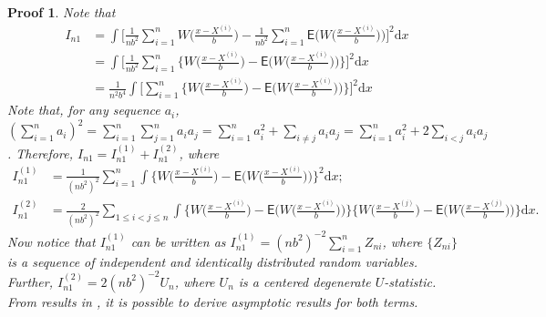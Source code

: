 \documentclass{article}
\newtheorem{Proof}{Proof}[section]
\begin{document}
\begin{Proof}
    Note that
    \begin{align}
        I_{n1} &= \int \Bigg[ \frac{1}{nb^2} \sum_{i=1}^{n} W \Bigg( \frac{x - X^{(i)}}{b} \Bigg) - \frac{1}{nb^2} \sum_{i=1}^{n} \mathsf{E} \Bigg( W \Bigg( \frac{x - X^{(i)}}{b} \Bigg) \Bigg) \Bigg]^2 \mathrm{d} x \\
        &= \int \Bigg[ \frac{1}{nb^2} \sum_{i=1}^{n} \Bigg\{ W \Bigg( \frac{x - X^{(i)}}{b} \Bigg) - \mathsf{E} \Bigg( W \Bigg( \frac{x - X^{(i)}}{b} \Bigg) \Bigg) \Bigg\} \Bigg]^2 \mathrm{d} x \\
        &= \frac{1}{n^2b^4} \int \Bigg[ \sum_{i=1}^{n} \Bigg\{ W \Bigg( \frac{x - X^{(i)}}{b} \Bigg) - \mathsf{E} \Bigg( W \Bigg( \frac{x - X^{(i)}}{b} \Bigg) \Bigg) \Bigg\} \Bigg]^2 \mathrm{d} x
    \end{align}
    Note that, for any sequence $a_i$, $(\sum_{i=1}^{n} a_i)^2 = \sum_{i=1}^{n} \sum_{j=1}^{n} a_i a_j = \sum_{i=1}^{n} a_i^2 + \sum_{i \ne j} a_i a_j = \sum_{i=1}^{n} a_i^2 + 2 \sum_{i<j} a_i a_j$. Therefore, $I_{n1} = I_{n1}^{(1)} + I_{n1}^{(2)}$, where
    \begin{align}
        I_{n1}^{(1)} &= \frac{1}{(nb^2)^2} \sum_{i=1}^{n} \int \Bigg\{ W \Bigg( \frac{x - X^{(i)}}{b} \Bigg) - \mathsf{E} \Bigg( W \Bigg( \frac{x - X^{(i)}}{b} \Bigg) \Bigg) \Bigg\}^2 \mathrm{d}x; \\
        I_{n1}^{(2)} &= \frac{2}{(nb^2)^2} \sum_{1 \le i < j \le n} \int \Bigg\{ W \Bigg( \frac{x - X^{(i)}}{b} \Bigg) - \mathsf{E} \Bigg( W \Bigg( \frac{x - X^{(i)}}{b} \Bigg) \Bigg) \Bigg\} \Bigg\{ W \Bigg( \frac{x - X^{(j)}}{b} \Bigg) - \mathsf{E} \Bigg( W \Bigg( \frac{x - X^{(j)}}{b} \Bigg) \Bigg) \Bigg\} \mathrm{d}x.
    \end{align}
    Now notice that $I_{n1}^{(1)}$ can be written as $I_{n1}^{(1)} = (nb^2)^{-2} \sum_{i=1}^{n} Z_{ni}$, where $\{ Z_{ni} \}$ is a sequence of independent and identically distributed random variables. Further, $I_{n1}^{(2)} = 2(nb^2)^{-2} U_n$, where $U_n$ is a centered degenerate $U$-statistic. From results in \cite{hall1984central}, it is possible to derive asymptotic results for both terms.


\end{Proof}
\end{document}
